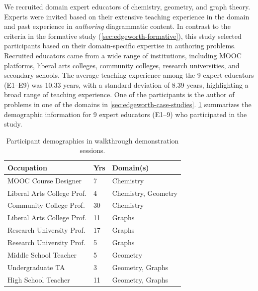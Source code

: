 We recruited domain expert educators of chemistry, geometry, and graph theory. Experts were invited based on their extensive teaching experience in the domain and past experience in \emph{authoring} diagrammatic content. In contrast to the criteria in the formative study (\cref{sec:edgeworth-formative}), this study selected participants based on their domain-specific expertise in authoring problems. Recruited educators came from a wide range of institutions, including MOOC platforms, liberal arts colleges, community colleges, research universities, and secondary schools. The average teaching experience among the 9 expert educators (E1–E9) was 10.33 years, with a standard deviation of 8.39 years, highlighting a broad range of teaching experience. One of the participants is the author of problems in one of the domains in \cref{sec:edgeworth-case-studies}.
\cref{tab:demographics} summarizes the demographic information for 9 expert educators (E1--9) who participated in the study. 

\begin{table}
    \centering
    \begin{tabular}{l|l|l}
        \textbf{Occupation} & \textbf{Yrs} & \textbf{Domain(s)}    \\
        \hline
        MOOC Course Designer       &  7 & Chemistry           \\ 
        Liberal Arts College Prof. &  4 & Chemistry, Geometry \\
        Community College Prof.    & 30 & Chemistry           \\
        Liberal Arts College Prof. & 11 & Graphs              \\
        Research University Prof.  & 17 & Graphs              \\
        Research University Prof.  &  5 & Graphs              \\
        Middle School Teacher      &  5 & Geometry            \\
        Undergraduate TA           &  3 & Geometry, Graphs    \\
        High School Teacher        & 11 & Geometry, Graphs    \\
    \end{tabular}
    \caption{Participant demographics in walkthrough demonstration sessions.}
    \label{tab:demographics}
\end{table}


